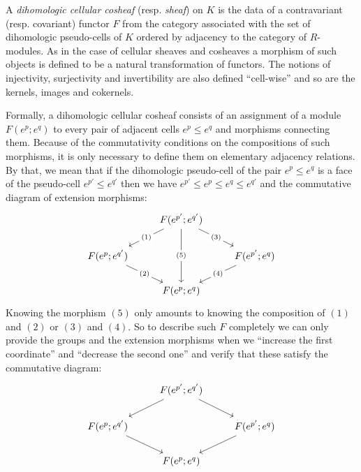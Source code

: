 \documentclass[AHL,Unicode,longabstracts,published]{cedram}
\begin{document}
\begin{defi}\label{definition:dih_cosheaves}
A \emph{dihomologic cellular cosheaf} (resp. \emph{sheaf}) on $K$ is the data of a contravariant (resp. covariant) functor $F$ from the category associated with the set of dihomologic pseudo-cells of $K$ ordered by adjacency to the category of $R$-modules. As in the case of cellular sheaves and cosheaves a morphism of such objects is defined to be a natural transformation of functors. The notions of injectivity, surjectivity and invertibility are also defined ``cell-wise'' and so are the kernels, images and cokernels.


Formally, a dihomologic cellular cosheaf consists of an assignment of a module $F(e^p;e^q)$ to every pair of adjacent cells $e^p\leq e^q$ and morphisms connecting them. Because of the commutativity conditions on the compositions of such morphisms, it is only necessary to define them on elementary adjacency relations. By that, we mean that if the dihomologic pseudo-cell of the pair $e^p\leq e^q$ is a face of the pseudo-cell $e^{p'}\leq e^{q'}$ then we have $e^{p'}\leq e^{p}\leq e^{q}\leq e^{q'}$ and the commutative diagram of extension morphisms:
\begin{equation*}
\begin{tikzcd}
& F(e^{p'};e^{q'}) \ar[dd, "(5)" description] \ar[dr,"(3)" description] \ar[dl,"(1)" description] & \\
F(e^{p};e^{q'}) \ar[dr,"(2)" description] & & F(e^{p'};e^{q}) \ar[dl,"(4)" description] \\
& F(e^{p};e^{q}) &
\end{tikzcd}
\end{equation*}
Knowing the morphism $(5)$ only amounts to knowing the composition of $(1)$ and $(2)$ or $(3)$ and $(4)$. So to describe such $F$ completely we can only provide the groups and the extension morphisms when we ``increase the first coordinate'' and ``decrease the second one'' and verify that these satisfy the commutative diagram:
\begin{equation*}
\begin{tikzcd}
& F(e^{p'};e^{q'}) \ar[dr] \ar[dl] & \\
F(e^{p};e^{q'}) \ar[dr] & & F(e^{p'};e^{q}) \ar[dl] \\
& F(e^{p};e^{q}) &
\end{tikzcd}
\end{equation*}
\end{defi}
\end{document}
